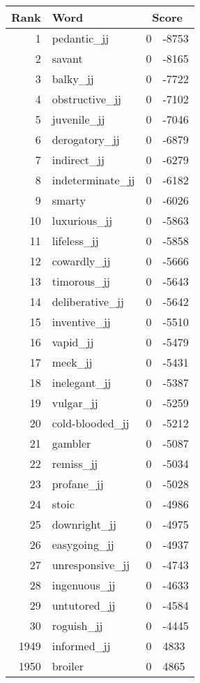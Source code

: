 \begin{longtable}[!htbp]{| rlr@{.}l |}
    \hline
    \textbf{Rank} & \textbf{Word} & \multicolumn{2}{c|}{\textbf{Score}} \\
    \hline
    \endhead
    1 & pedantic\_jj & 0 & -8753 \\
    2 & savant & 0 & -8165 \\
    3 & balky\_jj & 0 & -7722 \\
    4 & obstructive\_jj & 0 & -7102 \\
    5 & juvenile\_jj & 0 & -7046 \\
    6 & derogatory\_jj & 0 & -6879 \\
    7 & indirect\_jj & 0 & -6279 \\
    8 & indeterminate\_jj & 0 & -6182 \\
    9 & smarty & 0 & -6026 \\
    10 & luxurious\_jj & 0 & -5863 \\
    11 & lifeless\_jj & 0 & -5858 \\
    12 & cowardly\_jj & 0 & -5666 \\
    13 & timorous\_jj & 0 & -5643 \\
    14 & deliberative\_jj & 0 & -5642 \\
    15 & inventive\_jj & 0 & -5510 \\
    16 & vapid\_jj & 0 & -5479 \\
    17 & meek\_jj & 0 & -5431 \\
    18 & inelegant\_jj & 0 & -5387 \\
    19 & vulgar\_jj & 0 & -5259 \\
    20 & cold-blooded\_jj & 0 & -5212 \\
    21 & gambler & 0 & -5087 \\
    22 & remiss\_jj & 0 & -5034 \\
    23 & profane\_jj & 0 & -5028 \\
    24 & stoic & 0 & -4986 \\
    25 & downright\_jj & 0 & -4975 \\
    26 & easygoing\_jj & 0 & -4937 \\
    27 & unresponsive\_jj & 0 & -4743 \\
    28 & ingenuous\_jj & 0 & -4633 \\
    29 & untutored\_jj & 0 & -4584 \\
    30 & roguish\_jj & 0 & -4445 \\
    1949 & informed\_jj & 0 & 4833 \\
    1950 & broiler & 0 & 4865 \\

\end{longtable}
